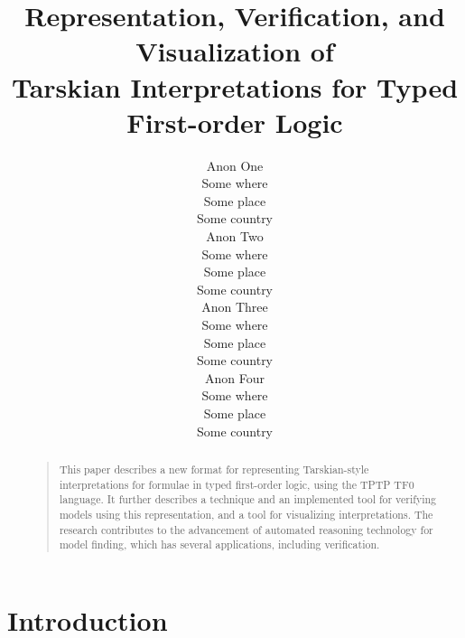 \documentclass[letterpaper]{article}
\begin{document}

\title{Representation, Verification, and Visualization of\\
Tarskian Interpretations for Typed First-order Logic}
\author{Anon One\\
Some where\\
Some place\\
Some country\\
\And
Anon Two\\
Some where\\
Some place\\
Some country\\
\And
Anon Three\\
Some where\\
Some place\\
Some country\\
\And
Anon Four\\
Some where\\
Some place\\
Some country}

\maketitle
\begin{abstract}
\begin{quote}
This paper describes a new format for representing Tarskian-style interpretations for formulae in 
typed first-order logic, using the TPTP TF0 language.
It further describes a technique and an implemented tool for verifying models using this
representation, and a tool for visualizing interpretations.
The research contributes to the advancement of automated reasoning technology for model finding, 
which has several applications, including verification.
\end{quote}
\end{abstract}
\section{Introduction}
\label{Introduction}
\end{document}

